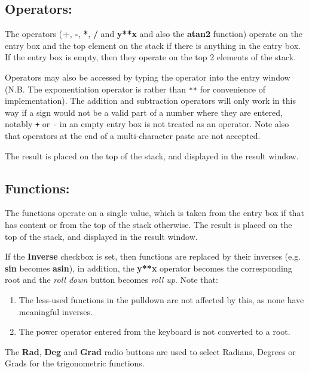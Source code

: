 \documentclass{article}
\begin{document}
  \subsection{Operators:}

  The operators (\textbf{+}, \textbf{-}, \textbf{*}, \textbf{/} and
  \textbf{y**x} and also the \textbf{atan2} function) operate on the entry
  box and the top element on the stack if there is anything in the
  entry box. If the entry box is empty, then they operate on the top 2
  elements of the stack.

  Operators may also be accessed by typing the operator into the entry
  window (N.B. The exponentiation operator is \texttt{\Circum} rather than
  \texttt{**} for convenience of implementation). The addition and
  subtraction operators will only work in this way if a sign would not
  be a valid part of a number where they are entered, notably
  \texttt{+} or \texttt{-} in an empty entry box is not treated as an
  operator. Note also that operators at the end of a multi-character
  paste are not accepted.

  The result is placed on the top of the stack, and displayed in the
  result window.

  \subsection{Functions:}

  The functions operate on a single value, which is taken from the
  entry box if that has content or from the top of the stack
  otherwise. The result is placed on the top of the stack, and
  displayed in the result window.

  If the \textbf{Inverse} checkbox is set, then functions are replaced
  by their inverses (e.g. \textbf{sin} becomes \textbf{asin}), in
  addition, the \textbf{y**x} operator becomes the
  corresponding root and the
  \emph{roll down} button becomes \emph{roll up}. Note that:
  \begin{enumerate}
  \item The less-used functions in the pulldown are not affected by
    this, as none have meaningful inverses.
  \item The power operator \textbf{\Circum} entered from the keyboard is not
    converted to a root.
  \end{enumerate}

  The \textbf{Rad}, \textbf{Deg} and \textbf{Grad} radio buttons are
  used to select Radians, Degrees or Grads for the trigonometric
  functions.
\end{document}
